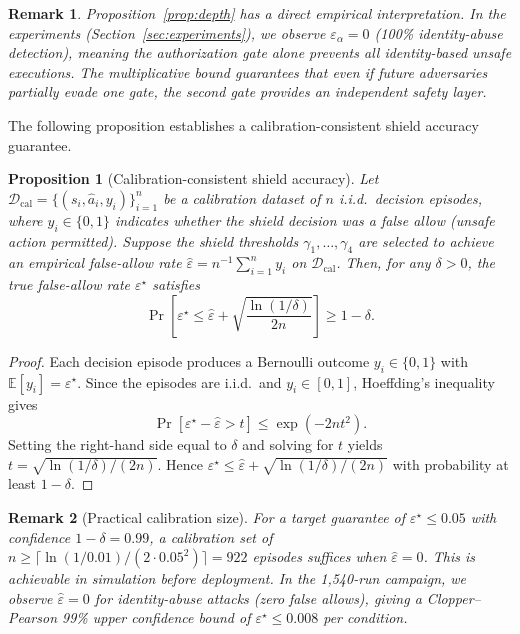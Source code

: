 \documentclass[10pt,journal,compsoc]{IEEEtran}
\newtheorem{proposition}{Proposition}
\newtheorem{remark}{Remark}
\begin{document}
\begin{remark}
Proposition~\ref{prop:depth} has a direct empirical interpretation.
In the experiments (Section~\ref{sec:experiments}), we observe $\varepsilon_\alpha = 0$ (100\% identity-abuse detection), meaning the authorization gate alone prevents all identity-based unsafe executions.
The multiplicative bound guarantees that even if future adversaries partially evade one gate, the second gate provides an independent safety layer.
\end{remark}

The following proposition establishes a calibration-consistent shield accuracy guarantee.

\begin{proposition}[Calibration-consistent shield accuracy]
\label{prop:calibration}
Let $\mathcal{D}_{\mathrm{cal}} = \{(s_i, \hat{a}_i, y_i)\}_{i=1}^{n}$ be a calibration dataset of $n$ i.i.d.\ decision episodes, where $y_i \in \{0,1\}$ indicates whether the shield decision was a \emph{false allow} (unsafe action permitted).
Suppose the shield thresholds $\gamma_1,\ldots,\gamma_4$ are selected to achieve an empirical false-allow rate $\hat{\varepsilon} = n^{-1}\sum_{i=1}^{n} y_i$ on $\mathcal{D}_{\mathrm{cal}}$.
Then, for any $\delta > 0$, the true false-allow rate $\varepsilon^\star$ satisfies
\[
\Pr\!\left[\varepsilon^\star \le \hat{\varepsilon} + \sqrt{\frac{\ln(1/\delta)}{2n}}\right] \ge 1 - \delta.
\]
\end{proposition}
\begin{proof}
Each decision episode produces a Bernoulli outcome $y_i \in \{0,1\}$ with $\mathbb{E}[y_i] = \varepsilon^\star$.
Since the episodes are i.i.d.\ and $y_i \in [0,1]$, Hoeffding's inequality~\cite{hoeffding1963} gives
\[
\Pr\!\left[\varepsilon^\star - \hat{\varepsilon} > t\right] \le \exp(-2nt^2).
\]
Setting the right-hand side equal to $\delta$ and solving for $t$ yields $t = \sqrt{\ln(1/\delta)/(2n)}$.
Hence $\varepsilon^\star \le \hat{\varepsilon} + \sqrt{\ln(1/\delta)/(2n)}$ with probability at least $1-\delta$.
\end{proof}

\begin{remark}[Practical calibration size]
For a target guarantee of $\varepsilon^\star \le 0.05$ with confidence $1-\delta = 0.99$, a calibration set of $n \ge \lceil \ln(1/0.01)/(2 \cdot 0.05^2) \rceil = 922$ episodes suffices when $\hat{\varepsilon} = 0$.
This is achievable in simulation before deployment.
In the 1,540-run campaign, we observe $\hat{\varepsilon} = 0$ for identity-abuse attacks (zero false allows), giving a Clopper--Pearson 99\% upper confidence bound of $\varepsilon^\star \le 0.008$ per condition.
\end{remark}
\end{document}
